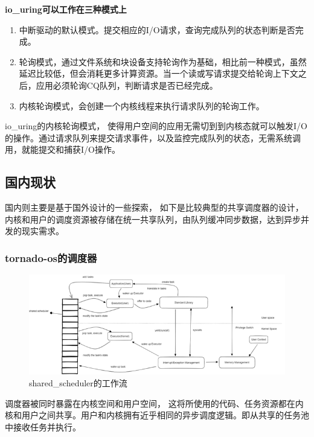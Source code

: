 \textbf{io\_uring可以工作在三种模式上}
\begin{enumerate}
\item 中断驱动的默认模式。提交相应的I/O请求，查询完成队列的状态判断是否完成。
\item 轮询模式，通过文件系统和块设备支持轮询作为基础，相比前一种模式，虽然延迟比较低，但会消耗更多计算资源。当一个读或写请求提交给轮询上下文之后，应用必须轮询CQ队列，判断请求是否已经完成。
\item 内核轮询模式，会创建一个内核线程来执行请求队列的轮询工作。
\end{enumerate}

io\_uring的内核轮询模式， 使得用户空间的应用无需切到到内核态就可以触发I/O的操作。通过请求队列来提交请求事件，以及监控完成队列的状态，无需系统调用，就能提交和捕获I/O操作。


\subsection{国内现状}

国内则主要是基于国外设计的一些探索， 如下是比较典型的共享调度器的设计，内核和用户的调度资源被存储在统一共享队列，由队列缓冲同步数据，达到异步并发的现实需求。

\subsubsection{tornado-os的调度器}
\begin{figure}[htb]
    \figureCapSet
    \centering
    \includegraphics[width=.8\linewidth]{figure/c1/sharedscheduler.png}
    \caption{shared\_scheduler的工作流}
    \label{figure:c1sharedscheduler}
\end{figure}

调度器被同时暴露在内核空间和用户空间， 这将所使用的代码、任务资源都在内核和用户之间共享。用户和内核拥有近乎相同的异步调度逻辑。即从共享的任务池中接收任务并执行。

